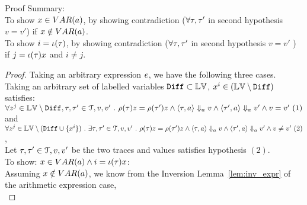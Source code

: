 Proof Summary: 
\\
To show $x \in VAR(a)$, by showing contradiction ($\forall \mathtt{\tau}, \mathtt{\tau}'$ in second hypothesis  $v = v'$)
 if $x \notin VAR(a)$.
 \\
To show $i = \iota(\mathtt{\tau})$, by showing contradiction ($\forall \mathtt{\tau}, \mathtt{\tau}'$ in second hypothesis  $v = v'$ ) 
if $j = \iota(\mathtt{\tau}) x$ and $i \neq j$.
\begin{proof}
	Taking an arbitrary expression $e$,
	 we have the following three cases.
Taking an arbitrary set of labelled variables 
	$\mathtt{Diff} \subset \mathbb{LV}$, $x^i \in (\mathbb{LV} \setminus \mathtt{Diff})$ satisfies:
	\\
	$\forall z^j \in \mathbb{LV} \setminus \mathtt{Diff}, \mathtt{\tau}, \mathtt{\tau}' \in \mathcal{T}, v, v' ~.~ 
	\rho(\mathtt{\tau}) z = \rho(\mathtt{\tau}') z \land 
	\langle \mathtt{\tau}, a \rangle \Downarrow_a v \land \langle \mathtt{\tau}', a \rangle \Downarrow_a v' \land v = v' ~ (1)
	$
	\\
	and 
	$\forall z^j \in \mathbb{LV} \setminus (\mathtt{Diff} \cup \{x^i\} ) ~.~ 
	\exists \mathtt{\tau}, \mathtt{\tau}' \in \mathcal{T}, v, v'~.~ 
	\rho(\mathtt{\tau}) z = \rho(\mathtt{\tau}') z \land 
	\langle \mathtt{\tau}, a \rangle \Downarrow_a v \land \langle \mathtt{\tau}', a \rangle \Downarrow_a v' \land v \neq v' ~ (2) 
	$,
	\\
	Let $\mathtt{\tau}, \mathtt{\tau}' \in \mathcal{T}, v, v'$ be the two traces and values satisfies hypothesis $(2)$.
	\\
	To show: $x \in VAR(a) \land i = \iota(\mathtt{\tau}) x$:
	\\
Assuming $x \notin VAR(a)$, we know from the Inversion Lemma~\ref{lem:inv_expr} of the arithmetic expression case,
\\

\end{proof}

